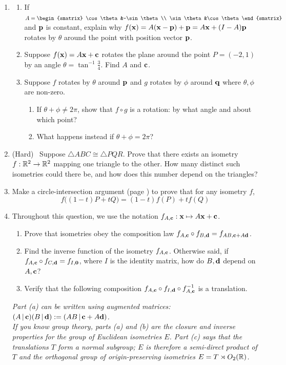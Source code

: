 \begin{exercises}
\begin{enumerate}
		\item\label{exs:genrotref}\begin{enumerate}
		  \item If $A=
		  \begin{smatrix}
		  	\cos\theta&-\sin\theta\\
		  	\sin\theta&\cos\theta
		  \end{smatrix}$ and ${\mathbf{p}}$ is constant, explain why $f({\mathbf{x}})=A({\mathbf{x}}-{\mathbf{p}})+{\mathbf{p}}=A{\mathbf{x}}+(I-A){\mathbf{p}}$ rotates by $\theta$ around the point with position vector ${\mathbf{p}}$.
		  \item Suppose $f({\mathbf{x}})=A{\mathbf{x}}+{\mathbf{c}}$ rotates the plane around the point $P=(-2,1)$ by an angle $\theta=\tan^{-1}\frac 34$. Find $A$ and ${\mathbf{c}}$.
		  \item Suppose $f$ rotates by $\theta$ around ${\mathbf{p}}$ and $g$ rotates by $\phi$ around ${\mathbf{q}}$ where $\theta,\phi$ are non-zero.
			\begin{enumerate}
		  	\item If $\theta+\phi\neq 2\pi$, show that $f\circ g$ is a rotation: by what angle and about which point?
		  	\item What happens instead if $\theta+\phi=2\pi$?
			\end{enumerate}
		\end{enumerate}
		
		\item\label{exs:isocong} (Hard) \ Suppose $\triangle ABC\cong\triangle PQR$. Prove that there exists an isometry $f:\mathbb{R}^2\to\mathbb{R}^2$ mapping one triangle to the other. How many distinct such isometries could there be, and how does this number depend on the triangles?
		
		\item Make a circle-intersection argument (page \pageref{affinity}) to prove that for any isometry $f$,
		\[
			f\bigl((1-t)P+tQ\bigr)=(1-t)f(P)+tf(Q)
		\]
	
	  \item\label{exs:kleingroup} Throughout this question, we use the notation $f_{A,{\mathbf{c}}}:{\mathbf{x}}\mapsto A{\mathbf{x}}+{\mathbf{c}}$.
	  \begin{enumerate}
	    \item Prove that isometries obey the composition law $f_{A,{\mathbf{c}}}\circ f_{B,{\mathbf{d}}}=f_{AB,{\mathbf{c}}+A{\mathbf{d}}}$.
	    \item Find the inverse function of the isometry $f_{A,{\mathbf{c}}}$. Otherwise said, if $f_{A,{\mathbf{c}}}\circ f_{C,{\mathbf{d}}}=f_{I,{\mathbf{0}}}$, where $I$ is the identity matrix, how do $B,{\mathbf{d}}$ depend on $A,{\mathbf{c}}$?
	    \item Verify that the following composition $f_{A,{\mathbf{c}}}\circ f_{I,{\mathbf{d}}}\circ f_{A,{\mathbf{c}}}^{-1}$ is a translation.
	  \end{enumerate}
		\emph{Part (a) can be written using augmented matrices: $(A\,|\,{\mathbf{c}})(B\,|\,{\mathbf{d}}):=(AB\,|\,{\mathbf{c}}+A{\mathbf{d}})$.\\
		If you know group theory, parts (a) and (b) are the closure and inverse properties for the group of Euclidean isometries $E$. Part (c) says that the translations $T$ form a normal subgroup; $E$ is therefore a semi-direct product of $T$ and the orthogonal group of origin-preserving isometries $E=T\rtimes O_2(\mathbb{R})$.
		}


\end{enumerate}
\end{exercises}
